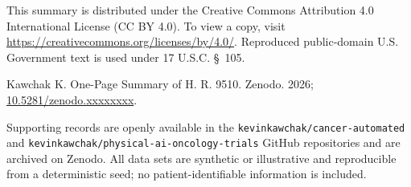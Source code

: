 This summary is distributed under the Creative Commons Attribution 4.0 International
License (CC BY 4.0). To view a copy, visit
\url{https://creativecommons.org/licenses/by/4.0/}. Reproduced public-domain U.S.
Government text is used under 17 U.S.C. \S~105.

Kawchak K. One-Page Summary of H. R. 9510. Zenodo. 2026; \href{https://doi.org/10.5281/zenodo.xxxxxxxx}{10.5281/zenodo.xxxxxxxx}.

Supporting records are openly available in the \texttt{kevinkawchak/cancer-automated}
and \texttt{kevinkawchak/physical-ai-oncology-trials} GitHub repositories and are
archived on Zenodo. All data sets are synthetic or illustrative and reproducible from a
deterministic seed; no patient-identifiable information is included.
